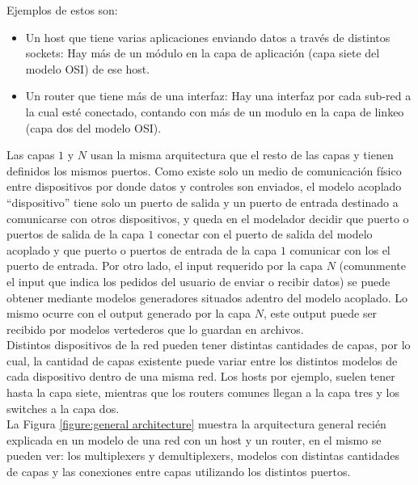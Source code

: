 \documentclass[10pt,a4paper]{article}
\begin{document}
Ejemplos de estos son: 
\begin{itemize}
\item Un host que tiene varias aplicaciones enviando datos a través de distintos sockets: Hay más de un módulo en la capa de aplicación (capa siete del modelo OSI) de ese host.
\item  Un router que tiene más de una interfaz: Hay una interfaz por cada sub-red a la cual esté conectado, contando con más de un modulo en la capa de linkeo (capa dos del modelo OSI).
\end{itemize}

Las capas $1$ y $N$ usan la misma arquitectura que el resto de las capas y tienen definidos los mismos puertos. Como existe solo un medio de comunicación físico entre dispositivos por donde datos y controles son enviados, el modelo acoplado ``dispositivo'' tiene solo un puerto de salida y un puerto de entrada destinado a comunicarse con otros dispositivos, y queda en el modelador decidir que puerto o puertos de salida de la capa $1$ conectar con el puerto de salida del modelo acoplado y que puerto o puertos de entrada de la capa $1$ comunicar con los el puerto de entrada. Por otro lado, el input requerido por la capa $N$ (comunmente el input que indica los pedidos del usuario de enviar o recibir datos) se puede obtener mediante modelos generadores situados adentro del modelo acoplado. Lo mismo ocurre con el output generado por la capa $N$, este output puede ser recibido por modelos vertederos que lo guardan en archivos. \\

Distintos dispositivos de la red pueden tener distintas cantidades de capas, por lo cual, la cantidad de capas existente puede variar entre los distintos modelos de cada dispositivo dentro de una misma red. Los hosts por ejemplo, suelen tener hasta la capa siete, mientras que los routers comunes llegan a la capa tres y los switches a la capa dos. \\

La Figura \ref{figure:general architecture} muestra la arquitectura general recién explicada en un modelo de una red con un host y un router, en el mismo se pueden ver: los multiplexers y demultiplexers, modelos con distintas cantidades de capas y las conexiones entre capas utilizando los distintos puertos. \\
\end{document}
